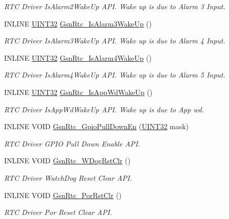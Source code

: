 \begin{DoxyCompactItemize}
\begin{DoxyCompactList}\small\item\em RTC Driver IsAlarm2WakeUp API. Wake up is due to Alarm 3 Input. \end{DoxyCompactList}\item 
INLINE \hyperlink{a00660_gae1e6edbbc26d6fbc71a90190d0266018}{UINT32} \hyperlink{a00651_gadb9866fc21dcef32deabace308a78200}{GsnRtc\_\-IsAlarm3WakeUp} ()
\begin{DoxyCompactList}\small\item\em RTC Driver IsAlarm3WakeUp API. Wake up is due to Alarm 4 Input. \end{DoxyCompactList}\item 
INLINE \hyperlink{a00660_gae1e6edbbc26d6fbc71a90190d0266018}{UINT32} \hyperlink{a00651_ga8b0b40139b7b358a239851f0f4784a3d}{GsnRtc\_\-IsAlarm4WakeUp} ()
\begin{DoxyCompactList}\small\item\em RTC Driver IsAlarm4WakeUp API. Wake up is due to Alarm 5 Input. \end{DoxyCompactList}\item 
INLINE \hyperlink{a00660_gae1e6edbbc26d6fbc71a90190d0266018}{UINT32} \hyperlink{a00651_gaf64956b6c0d9bad7a2af010b0f5fbf15}{GsnRtc\_\-IsAppWdWakeUp} ()
\begin{DoxyCompactList}\small\item\em RTC Driver IsAppWdWakeUp API. Wake up is due to App wd. \end{DoxyCompactList}\item 
INLINE VOID \hyperlink{a00651_ga4562094b52ee5ba2c4eda48dc602929f}{GsnRtc\_\-GpioPullDownEn} (\hyperlink{a00660_gae1e6edbbc26d6fbc71a90190d0266018}{UINT32} mask)
\begin{DoxyCompactList}\small\item\em RTC Driver GPIO Pull Down Enable API. \end{DoxyCompactList}\item 
INLINE VOID \hyperlink{a00651_ga5c7e28c93ba1d286490bf3fa8286022b}{GsnRtc\_\-WDogRstClr} ()
\begin{DoxyCompactList}\small\item\em RTC Driver WatchDog Reset Clear API. \end{DoxyCompactList}\item 
INLINE VOID \hyperlink{a00651_ga34f15d48bb91c7bbad8388e7e88195b1}{GsnRtc\_\-PorRstClr} ()
\begin{DoxyCompactList}\small\item\em RTC Driver Por Reset Clear API. \end{DoxyCompactList}\item 

\end{DoxyCompactItemize}
